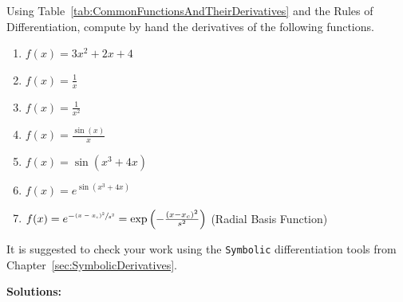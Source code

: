 \begin{example} Using Table~\ref{tab:CommonFunctionsAndTheirDerivatives} and the Rules of Differentiation, compute by hand the derivatives of the following functions.

 \begin{enumerate}
   \renewcommand{\labelenumi}{(\alph{enumi})}
    \setlength{\itemsep}{.2cm}

    \item $f(x) = 3x^2 + 2x + 4$ 

    \item $f(x) = \frac{1}{x}$ 

    \item $f(x) = \frac{1}{x^2}$ 

    \item $f(x) = \frac{\sin(x)}{x}$ 

    \item $f(x) = \sin(x^3 + 4x)$ 

    \item $f(x) = e^{\sin(x^3 + 4x)}$ 

    \item $f(x) = e^{-\sfrac{(x-x_c)^2}{s^2}} = \exp\left(-\frac{(x-x_c)^2}{s^2} \right)$  (Radial Basis Function)

    \end{enumerate}

 It is suggested to check your work using the \texttt{Symbolic} differentiation tools from Chapter~\ref{sec:SymbolicDerivatives}.    
\end{example}

\textbf{Solutions:} 

